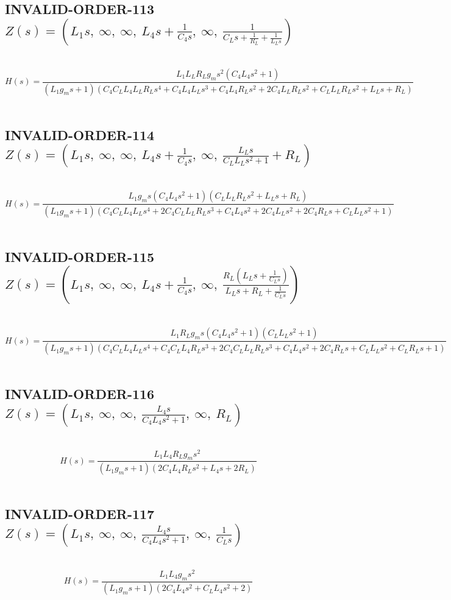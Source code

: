 \documentclass{article}
\begin{document}
\subsection{INVALID-ORDER-113 $Z(s) = \left( L_{1} s, \  \infty, \  \infty, \  L_{4} s + \frac{1}{C_{4} s}, \  \infty, \  \frac{1}{C_{L} s + \frac{1}{R_{L}} + \frac{1}{L_{L} s}}\right)$ } \ 
\textbf{\[H(s) = \frac{L_{1} L_{L} R_{L} g_{m} s^{2} \left(C_{4} L_{4} s^{2} + 1\right)}{\left(L_{1} g_{m} s + 1\right) \left(C_{4} C_{L} L_{4} L_{L} R_{L} s^{4} + C_{4} L_{4} L_{L} s^{3} + C_{4} L_{4} R_{L} s^{2} + 2 C_{4} L_{L} R_{L} s^{2} + C_{L} L_{L} R_{L} s^{2} + L_{L} s + R_{L}\right)}\] } \ 
\subsection{INVALID-ORDER-114 $Z(s) = \left( L_{1} s, \  \infty, \  \infty, \  L_{4} s + \frac{1}{C_{4} s}, \  \infty, \  \frac{L_{L} s}{C_{L} L_{L} s^{2} + 1} + R_{L}\right)$ } \ 
\textbf{\[H(s) = \frac{L_{1} g_{m} s \left(C_{4} L_{4} s^{2} + 1\right) \left(C_{L} L_{L} R_{L} s^{2} + L_{L} s + R_{L}\right)}{\left(L_{1} g_{m} s + 1\right) \left(C_{4} C_{L} L_{4} L_{L} s^{4} + 2 C_{4} C_{L} L_{L} R_{L} s^{3} + C_{4} L_{4} s^{2} + 2 C_{4} L_{L} s^{2} + 2 C_{4} R_{L} s + C_{L} L_{L} s^{2} + 1\right)}\] } \ 
\subsection{INVALID-ORDER-115 $Z(s) = \left( L_{1} s, \  \infty, \  \infty, \  L_{4} s + \frac{1}{C_{4} s}, \  \infty, \  \frac{R_{L} \left(L_{L} s + \frac{1}{C_{L} s}\right)}{L_{L} s + R_{L} + \frac{1}{C_{L} s}}\right)$ } \ 
\textbf{\[H(s) = \frac{L_{1} R_{L} g_{m} s \left(C_{4} L_{4} s^{2} + 1\right) \left(C_{L} L_{L} s^{2} + 1\right)}{\left(L_{1} g_{m} s + 1\right) \left(C_{4} C_{L} L_{4} L_{L} s^{4} + C_{4} C_{L} L_{4} R_{L} s^{3} + 2 C_{4} C_{L} L_{L} R_{L} s^{3} + C_{4} L_{4} s^{2} + 2 C_{4} R_{L} s + C_{L} L_{L} s^{2} + C_{L} R_{L} s + 1\right)}\] } \ 
\subsection{INVALID-ORDER-116 $Z(s) = \left( L_{1} s, \  \infty, \  \infty, \  \frac{L_{4} s}{C_{4} L_{4} s^{2} + 1}, \  \infty, \  R_{L}\right)$ } \ 
\textbf{\[H(s) = \frac{L_{1} L_{4} R_{L} g_{m} s^{2}}{\left(L_{1} g_{m} s + 1\right) \left(2 C_{4} L_{4} R_{L} s^{2} + L_{4} s + 2 R_{L}\right)}\] } \ 
\subsection{INVALID-ORDER-117 $Z(s) = \left( L_{1} s, \  \infty, \  \infty, \  \frac{L_{4} s}{C_{4} L_{4} s^{2} + 1}, \  \infty, \  \frac{1}{C_{L} s}\right)$ } \ 
\textbf{\[H(s) = \frac{L_{1} L_{4} g_{m} s^{2}}{\left(L_{1} g_{m} s + 1\right) \left(2 C_{4} L_{4} s^{2} + C_{L} L_{4} s^{2} + 2\right)}\] } \ 
\end{document}
